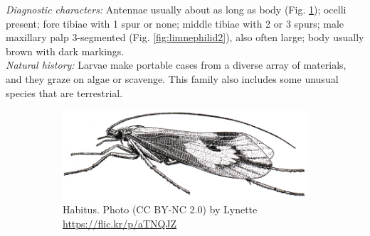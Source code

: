 \documentclass[letterpaper, 11pt]{article}
\begin{document}
\noindent{}\textit{Diagnostic characters:} Antennae usually about as long as body (Fig. \ref{fig:limnephilid1}); ocelli present; fore tibiae with 1 spur or none; middle tibiae with 2 or 3 spurs; male maxillary palp 3-segmented (Fig. \ref{fig:limnephilid2}), also often large; body usually brown with dark markings.\\ 

\noindent{}\textit{Natural history:} Larvae make portable cases from a diverse array of materials, and they graze on algae or scavenge. This family also includes some unusual species that are terrestrial.

\begin{figure}[ht!]
    \centering
    \begin{subfigure}[ht!]{0.68\textwidth}
        \includegraphics[width=\textwidth]{TrichoImage02}
        \caption{Habitus. Photo (CC BY-NC 2.0) by Lynette \url{https://flic.kr/p/aTNQJZ}}
        \label{fig:limnephilid1}
    \end{subfigure}
    \hfill %
    \begin{subfigure}[ht!]{0.15\textwidth}

\end{subfigure}
\end{figure}
\end{document}
